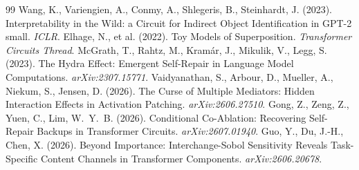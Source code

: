 \documentclass[11pt,a4paper]{article}
\begin{document}
\begin{thebibliography}{99}
 Wang, K., Variengien, A., Conmy, A., Shlegeris, B., Steinhardt, J. (2023). Interpretability in the Wild: a Circuit for Indirect Object Identification in GPT-2 small. \emph{ICLR}.
 Elhage, N., et al. (2022). Toy Models of Superposition. \emph{Transformer Circuits Thread}.
 McGrath, T., Rahtz, M., Kram\'ar, J., Mikulik, V., Legg, S. (2023). The Hydra Effect: Emergent Self-Repair in Language Model Computations. \emph{arXiv:2307.15771}.
 Vaidyanathan, S., Arbour, D., Mueller, A., Niekum, S., Jensen, D. (2026). The Curse of Multiple Mediators: Hidden Interaction Effects in Activation Patching. \emph{arXiv:2606.27510}.
 Gong, Z., Zeng, Z., Yuen, C., Lim, W.~Y.~B. (2026). Conditional Co-Ablation: Recovering Self-Repair Backups in Transformer Circuits. \emph{arXiv:2607.01940}.
 Guo, Y., Du, J.-H., Chen, X. (2026). Beyond Importance: Interchange-Sobol Sensitivity Reveals Task-Specific Content Channels in Transformer Components. \emph{arXiv:2606.20678}.
\end{thebibliography}
\end{document}
